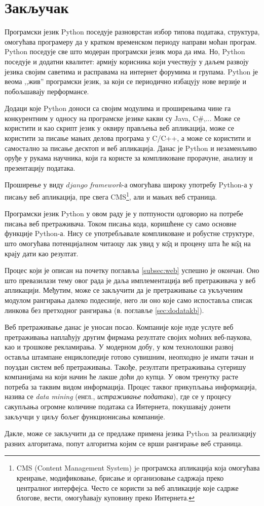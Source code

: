 \section{Закључак}

Програмски језик Python поседује разноврстан избор типова података, структура, омогућава програмеру да у кратком временском периоду направи моћан програм. Python поседује све што модеран програмски језик мора да има. Но, Python поседује  и додатни квалитет: армију корисника који учествују у даљем развоју језика својим саветима и расправама на интернет форумима и групама. Python је веома ,,жив'' програмски језик, за који се периодично избацују нове верзије и побољшавају перформансе.

Додаци које Python доноси са својим модулима и проширењима чине га конкурентним у односу на програмске језике какви су Java, C\#,... Може се користити и као скрипт језик у оквиру прављења веб апликација, може се користити за писање мањих делова програма у C/C++, а може се користити и самостално за писање десктоп и веб апликација. Данас је Python и незаменљиво оруђе у рукама научника, који га користе за компликоване прорачуне, анализу и презентацију података.

Проширење у виду $django$ \emph{framework}-а \cite{django} омогућава широку употребу Python-а у писању веб апликација, пре свега CMS\footnote{CMS (Content Management System) je програмска апликација која омогућава креирање, модификовање, брисање и организовање садржаја преко централног интерфејса. Често се користи за веб апликације које садрже блогове, вести, омогућавају куповину преко Интернета.}, али и мањих веб страница.

Програмски језик Python у овом раду је у потпуности одговорио на потребе писања веб претраживача. Током писања кода, коришћене су само основне функције Python-а. Нису се употребљавале компликоване и робустне структуре, што омогућава потенцијалном читаоцу лак увид у к\^{о}д и процену шта ће к\^{о}д на крају дати као резултат.

Процес који је описан на почетку поглавља \ref{subsec:web} успешно је окончан. Оно што превазилази тему овог рада је даља имплементација веб претраживача у веб апликацији. Међутим, може се закључити да је претраживање са укљученим модулом рангирања далеко подесније, него ли оно које само испоставља списак линкова без претходног рангирања (в. поглавље \ref{sec:dodatakb}).

Веб претраживање данас је уносан посао. Компаније које нуде услуге веб претраживања наплаћују другим фирмама резултате својих моћних веб-паукова, као и трошкове рекламирања. У модерном добу, у ком технолошки развој оставља штампане енциклопедије готово сувишним, неопходно је имати тачан и поуздан систем веб претраживања. Такође, резултати претраживања сугеришу компанијама на који начин ће лакше доћи до купца. У овом тренутку расте потреба за таквим видом информација. Процес таквог прикупљања информација, назива се \emph{data mining} (енгл., \emph{истраживање података}), где се у процесу сакупљања огромне количине података са Интернета, покушавају донети закључци у циљу бољег функционисања компаније.

Дакле, може се закључити да се предлаже примена језика Python за реализацију разних алгоритама, попут алгоритма којим се врши рангирање веб страница.
